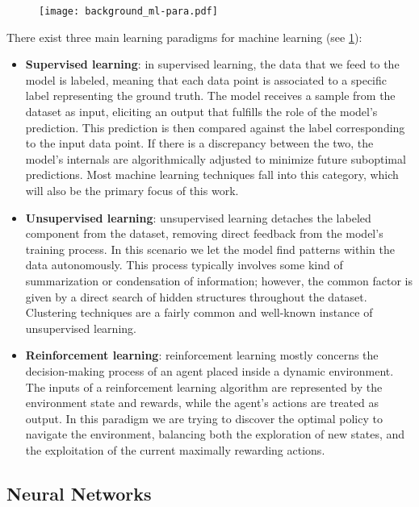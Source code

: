 \begin{figure}[t!]
    \centering
    \texttt{[image: background\_ml-para.pdf]}
    \caption{}
    \label{fig:background_ml-paradigm}
\end{figure}

There exist three main learning paradigms for machine learning (see \cref{fig:background_ml-paradigm}):
\begin{itemize}
    \item \textbf{Supervised learning}: in supervised learning, the data that we feed to the model is labeled, meaning that each data point is associated to a specific label representing the ground truth.
The model receives a sample from the dataset as input, eliciting an output that fulfills the role of the model's prediction.
This prediction is then compared against the label corresponding to the input data point.
If there is a discrepancy between the two, the model's internals are algorithmically adjusted to minimize future suboptimal predictions.
Most machine learning techniques fall into this category, which will also be the primary focus of this work.
    \item \textbf{Unsupervised learning}: unsupervised learning detaches the labeled component from the dataset, removing direct feedback from the model's training process.
In this scenario we let the model find patterns within the data autonomously.
This process typically involves some kind of summarization or condensation of information; however, the common factor is given by a direct search of hidden structures throughout the dataset.
Clustering techniques are a fairly common and well-known instance of unsupervised learning. 
    \item \textbf{Reinforcement learning}: reinforcement learning mostly concerns the decision-making process of an agent placed inside a dynamic environment.
The inputs of a reinforcement learning algorithm are represented by the environment state and rewards, while the agent's actions are treated as output.
In this paradigm we are trying to discover the optimal policy to navigate the environment, balancing both the exploration of new states, and the exploitation of the current maximally rewarding actions.
\end{itemize}

\subsection{Neural Networks}


